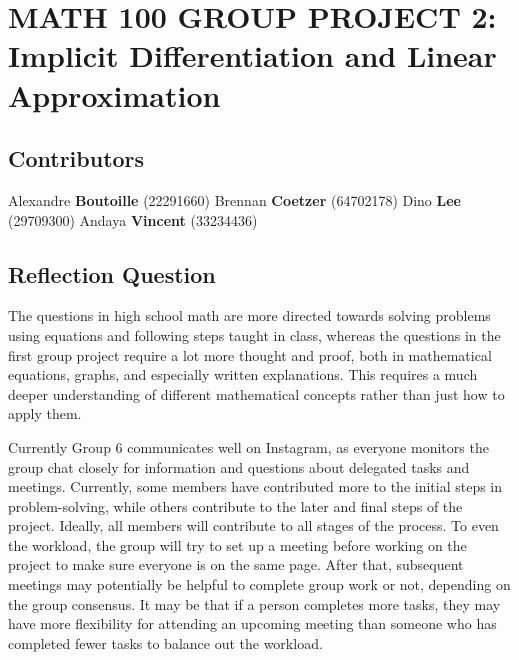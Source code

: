 \documentclass[answers,addpoints]{exam}
\begin{document}
\section*{MATH 100 GROUP PROJECT 2: \\Implicit Differentiation and Linear Approximation}

\normalsize

\subsection*{Contributors}

Alexandre \textbf{Boutoille} (22291660) Brennan \textbf{Coetzer} (64702178) Dino \textbf{Lee} (29709300) Andaya \textbf{Vincent} (33234436)

\hrulefill

\subsection*{Reflection Question}

\begin{solution}
  The questions in high school math are more directed towards solving problems using equations and following steps taught in class, whereas the questions in the first group project require a lot more thought and proof, both in mathematical equations, graphs, and especially written explanations. This requires a much deeper understanding of different mathematical concepts rather than just how to apply them.

  Currently Group 6 communicates well on Instagram, as everyone monitors the group chat closely for information and questions about delegated tasks and meetings. Currently, some members have contributed more to the initial steps in problem-solving, while others contribute to the later and final steps of the project. Ideally, all members will contribute to all stages of the process. To even the workload, the group will try to set up a meeting before working on the project to make sure everyone is on the same page. After that, subsequent meetings may potentially be helpful to complete group work or not, depending on the group consensus. It may be that if a person completes more tasks, they may have more flexibility for attending an upcoming meeting than someone who has completed fewer tasks to balance out the workload.
\end{solution}

\hrulefill

\newpage
\end{document}
